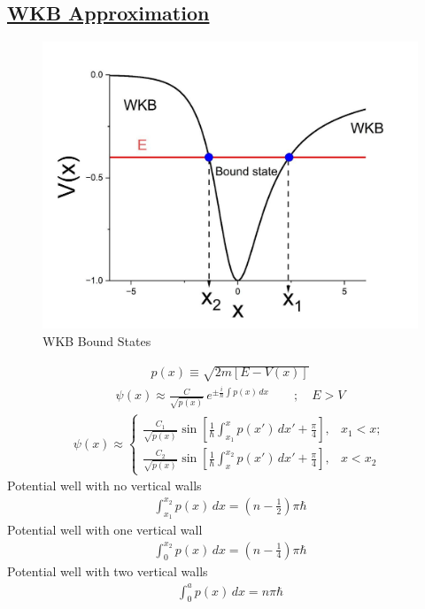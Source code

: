 \newpage
\subsection*{\underline{WKB Approximation}}
\begin{figure}[h]
	\centering
	\includegraphics[width=0.5\linewidth]{./figures/wkb-bound-states.png}
	\caption{WKB Bound States}
	\label{fig:wkb-bound-states}
\end{figure}
\begin{align}
	p(x) \equiv \sqrt{2m[E-V(x)]}
\end{align}
\begin{align}
	\psi(x) \approx \frac{C}{\sqrt{p(x)}} \, e^{\pm \frac{i}{\hbar} \int p(x)\, dx}
	\qquad; \quad E > V
\end{align}
\begin{align}
	\psi(x) \approx \begin{cases}
		\frac{C_1}{\sqrt{p(x)}} \sin{\left[ \frac{1}{\hbar} \int_{x_1}^{x} p(x')\, dx' + \frac{\pi}{4}\right]}, & x_1<x ; \\
		\frac{C_2}{\sqrt{p(x)}} \sin{\left[ \frac{1}{\hbar} \int_{x}^{x_2} p(x')\, dx' + \frac{\pi}{4}\right]}, & x<x_2 
	\end{cases}
\end{align}
Potential well with no vertical walls
\begin{align}
	\int_{x_1}^{x_2} p(x) \, dx = \left( n - \frac{1}{2} \right) \pi \hbar
\end{align}
Potential well with one vertical wall
\begin{align}
	\int_0^{x_2} p(x)\, dx = \left(n - \frac{1}{4} \right) \pi \hbar
\end{align}
Potential well with two vertical walls
\begin{align}
	\int_0^a p(x) \, dx = n\pi \hbar
\end{align}




